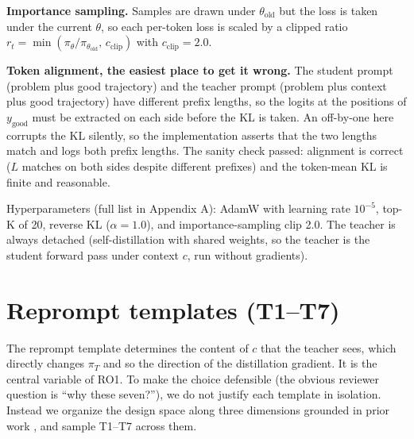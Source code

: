 \textbf{Importance sampling.} Samples are drawn under \(\theta_{\text{old}}\) but the loss is taken under the current \(\theta\), so each per-token loss is scaled by a clipped ratio \(r_t = \min(\pi_\theta/\pi_{\theta_\text{old}},\, c_{\text{clip}})\) with \(c_{\text{clip}} = 2.0\).

\textbf{Token alignment, the easiest place to get it wrong.} The student prompt (problem plus good trajectory) and the teacher prompt (problem plus context plus good trajectory) have different prefix lengths, so the logits at the positions of \(y_{\text{good}}\) must be extracted on each side before the KL is taken. An off-by-one here corrupts the KL silently, so the implementation asserts that the two lengths match and logs both prefix lengths. The sanity check passed: alignment is correct (\(L\) matches on both sides despite different prefixes) and the token-mean KL is finite and reasonable.

Hyperparameters (full list in Appendix A): AdamW with learning rate \(10^{-5}\), top-K of 20, reverse KL (\(\alpha = 1.0\)), and importance-sampling clip 2.0. The teacher is always detached (self-distillation with shared weights, so the teacher is the student forward pass under context \(c\), run without gradients).

\section{Reprompt templates (T1--T7)}\label{reprompt-templates-t1t7}

The reprompt template determines the content of \(c\) that the teacher sees, which directly changes \(\pi_T\) and so the direction of the distillation gradient. It is the central variable of RO1. To make the choice defensible (the obvious reviewer question is ``why these seven?''), we do not justify each template in isolation. Instead we organize the design space along three dimensions grounded in prior work \cite{r1, r2}, and sample T1--T7 across them.

